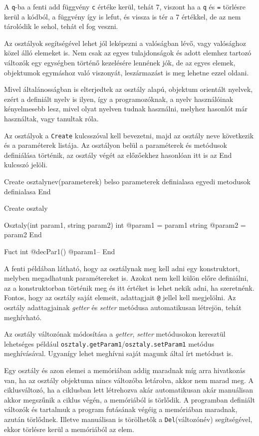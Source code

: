 A \texttt{q}-ba a fenti add függvény \texttt{c} értéke kerül, tehát 7, viszont ha a \texttt{q} és \texttt{=} törlésre kerül a kódból, a függvény így is lefut, és vissza is tér a 7 értékkel, de az nem tárolódik le sehol, tehát el fog veszni.

Az osztályok segítségével lehet jól leképezni a valóságban lévő, vagy valósághoz közel álló elemeket is. Nem csak az egyes tulajdonságok és adott elemhez tartozó változók egy egységben történő kezelésére lennének jók, de az egyes elemek, objektumok egymáshoz való viszonyát, leszármazást is meg lehetne ezzel oldani.

Mivel általánosságban is elterjedtek az osztály alapú, objektum orientált nyelvek, ezért a definiált nyelv is ilyen, így a programozóknak, a nyelv használóinak kényelmesebb lesz, mivel olyat nyelven tudnak használni, melyhez hasonlót már használtak, vagy tanultak róla.

Az osztályok a \texttt{Create} kulcsszóval kell bevezetni, majd az osztály neve következik és a paraméterek listája. Az osztályon belül a paraméterek és metódusok definiálása történik, az osztály végét az előzőekhez hasonlóan itt is az End kulcsszó jelöli.
\begin{cpp}
Create osztalynev(parameterek)
	belso parameterek definialasa
	egyedi metodusok definialasa
End
\end{cpp}

\begin{cpp}
Create osztaly
	
	Osztaly(int param1, string param2)
		int @param1 = param1
		string @param2 = param2
	End
		
	Fuct int @decPar1()
		@param1--
	End
\end{cpp}

A fenti példában látható, hogy az osztálynak meg kell adni egy konstruktort, melyben megadhatunk paramétereket is. Azokat nem kell külön előre definiálni, az a konstruktorban történik meg és itt értéket is lehet nekik adni, ha szeretnénk. Fontos, hogy az osztály saját elemeit, adattagjait \texttt{@} jellel kell megjelölni. Az osztály adattagjainak \textit{getter} és \textit{setter} metódusa automatikusan létrejön, tehát meghívható.

Az osztály változónak módosítása a \textit{getter}, \textit{setter} metódusokon keresztül lehetséges például \texttt{osztaly.getParam1}/\texttt{osztaly.setParam1} metódus meghívásával. Ugyanígy lehet meghívni saját magunk által írt metódust is.

Egy osztály és azon elemei a memóriában addig maradnak míg arra hivatkozás van, ha az osztály objektuma nincs változóba letárolva, akkor nem marad meg. A ciklusváltozó, ha a ciklusban lett létrehozva akár automatikusan akár manuálisan akkor megszűnik a ciklus végén, a memóriából is törlődik. A programban definiált változók és tartalmuk a program futásának végéig a memóriában maradnak, azután törlődnek. Illetve manuálisan is törölhetők a \texttt{Del}(változónév) segítségével, ekkor törlésre kerül a memóriából az elem.

